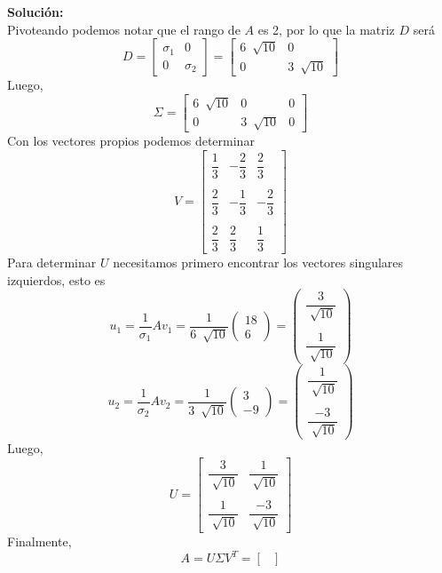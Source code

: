 \documentclass[12pt]{article}
\newenvironment{solucion}
{\begin{mdframed}[backgroundcolor=black!10]
		{\bf Solución:}\\
	}
	{
	\end{mdframed}
}
\newenvironment{preguntas}
{\begin{enumerate}\itemsep12pt
	}
	{
	\end{enumerate}
}
\begin{document}
\begin{preguntas}
\begin{solucion}
		Pivoteando podemos notar que el rango de $A$ es 2, por lo que la matriz $D$ será
		$$D = \begin{bmatrix}
		\sigma_1 & 0\\
		0 & \sigma_2
		\end{bmatrix} 
		= \begin{bmatrix}
		6 \ \sqrt[]{10} & 0\\
		0 & 3 \ \sqrt[]{10}
		\end{bmatrix} $$
		Luego,
		$$\Sigma = \begin{bmatrix}
		6 \ \sqrt[]{10} & 0 & 0\\
		0 & 3 \ \sqrt[]{10} & 0
		\end{bmatrix}$$
		Con los vectores propios podemos determinar
		$$V = \begin{bmatrix}
		\dfrac{1}{3} & -\dfrac{2}{3} & \dfrac{2}{3} \\\\
		\dfrac{2}{3} & -\dfrac{1}{3} & -\dfrac{2}{3}  \\\\
		\dfrac{2}{3} & \dfrac{2}{3}  & \dfrac{1}{3} 
		\end{bmatrix}$$
		Para determinar $U$ necesitamos primero encontrar los vectores singulares izquierdos, esto es
		$$u_1 = \dfrac{1}{\sigma_1} A v_1 = \dfrac{1}{6 \ \sqrt[]{10}} \begin{pmatrix}
		18 \\ 6
		\end{pmatrix} = 
		\begin{pmatrix}
		\dfrac{3}{\sqrt[]{10}} \\\\
		\dfrac{1}{\sqrt[]{10}}
		\end{pmatrix}$$
		$$u_2 = \dfrac{1}{\sigma_2} A v_2 = \dfrac{1}{3 \ \sqrt[]{10}} \begin{pmatrix}
		3 \\ -9
		\end{pmatrix} = 
		\begin{pmatrix}
		\dfrac{1}{\sqrt[]{10}} \\\\
		\dfrac{-3}{\sqrt[]{10}}
		\end{pmatrix}$$
		Luego,
		$$U = \begin{bmatrix}
		\dfrac{3}{\sqrt[]{10}} & \dfrac{1}{\sqrt[]{10}} \\\\
		\dfrac{1}{\sqrt[]{10}} & \dfrac{-3}{\sqrt[]{10}}
		\end{bmatrix}$$
		Finalmente,
		$$A = U \Sigma V^T = \begin{bmatrix}

\end{bmatrix}$$
\end{solucion}
\end{preguntas}
\end{document}
